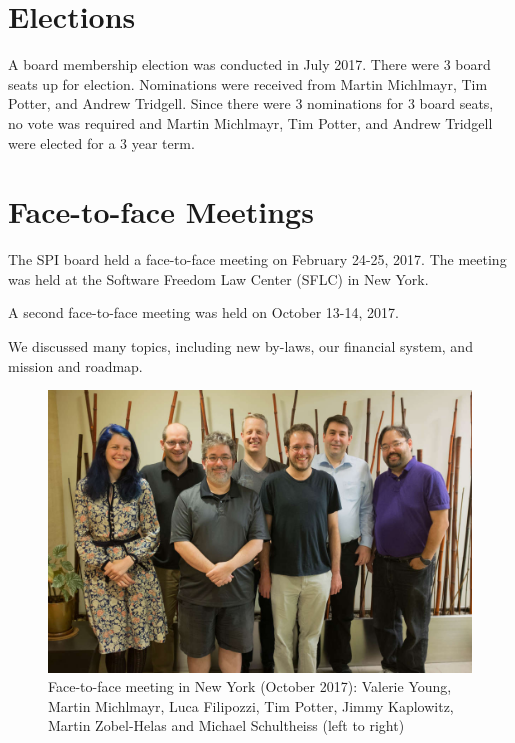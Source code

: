 \documentclass[a4paper]{report}
\begin{document}
\section{Elections}

A board membership election was conducted in July 2017.  There were 3 board
seats up for election.  Nominations were received from Martin Michlmayr,
Tim Potter, and Andrew Tridgell.  Since there were 3 nominations for 3
board seats, no vote was required and Martin Michlmayr, Tim Potter, and
Andrew Tridgell were elected for a 3 year term.

\section{Face-to-face Meetings}

The SPI board held a face-to-face meeting on February 24-25, 2017.
The meeting was held at the Software Freedom Law Center (SFLC) in New
York.

A second face-to-face meeting was held on October 13-14, 2017.

We discussed many topics, including new by-laws, our financial system,
and mission and roadmap.

\begin{figure}[h]
\centering

\includegraphics[scale=1.00]{images/2017-october-f2f}

\caption{Face-to-face meeting in New York (October 2017): Valerie Young,
Martin Michlmayr, Luca Filipozzi, Tim Potter, Jimmy Kaplowitz, Martin
Zobel-Helas and Michael Schultheiss (left to right)}

\end{figure}
\end{document}
